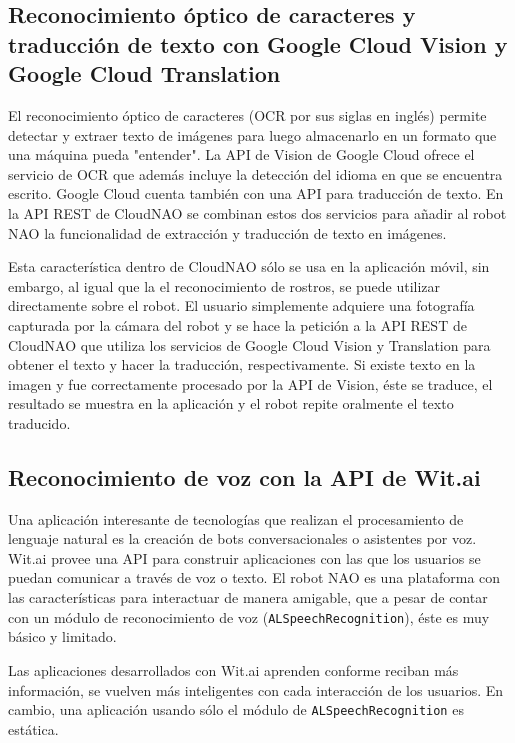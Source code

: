 \subsection{Reconocimiento óptico de caracteres y traducción de texto con Google Cloud Vision y Google Cloud Translation}

El reconocimiento óptico de caracteres (OCR por sus siglas en inglés) permite detectar y extraer texto de imágenes para luego
almacenarlo en un formato que una máquina pueda "entender".
La API de Vision de Google Cloud ofrece el servicio de OCR
que además incluye la detección del idioma en que se encuentra escrito.
Google Cloud cuenta también con una API para traducción de 
texto.
En la API REST de CloudNAO se combinan estos dos servicios
para añadir al robot NAO la funcionalidad de extracción y traducción de texto en imágenes. 

Esta característica dentro de CloudNAO sólo
se usa en la aplicación móvil, sin embargo, al igual que
la el reconocimiento de rostros, se puede utilizar directamente
sobre el robot. El usuario simplemente adquiere una fotografía
capturada por la cámara del robot y se hace la petición
a la API REST de CloudNAO que utiliza los servicios
de Google Cloud Vision y Translation para obtener el texto
y hacer la traducción, respectivamente.
Si existe texto en la imagen y fue correctamente procesado por
la API de Vision, éste se traduce, el resultado se muestra
en la aplicación y el robot repite oralmente
el texto traducido.

\subsection{Reconocimiento de voz con la API de Wit.ai}

Una aplicación interesante de tecnologías que realizan el 
procesamiento de lenguaje natural es la creación de bots conversacionales
o asistentes por voz. Wit.ai provee una API para construir aplicaciones
con las que los usuarios se puedan comunicar a través de voz o texto.
El robot NAO es una plataforma con las características 
para interactuar de manera amigable, que a pesar de contar con un
módulo de reconocimiento de voz (\texttt{ALSpeechRecognition}), éste es muy 
básico y limitado.

Las aplicaciones desarrollados con Wit.ai aprenden conforme reciban más 
información, se vuelven más inteligentes con cada interacción de los usuarios.
En cambio, una aplicación usando sólo el módulo de \texttt{ALSpeechRecognition} es estática.

